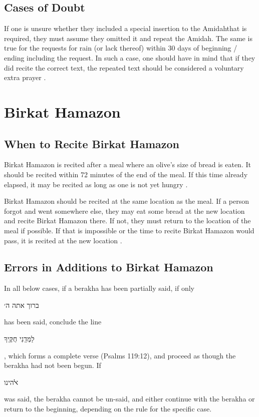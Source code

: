 \documentclass[11pt]{article}
\newcommand{\hebword}[1]{‎\begin{hebrew}\beginR #1 \endR\end{hebrew}}
\newcommand{\amidah}{Amidah\space}
\newcommand{\amidahnospace}{Amidah}
\begin{document}
\subsection{Cases of Doubt}

If one is unsure whether they included a special insertion to the \amidah that is required, they must assume they omitted it and repeat the \amidahnospace.  The same is true for the requests for rain (or lack thereof) within 30 days of beginning / ending including the request.  In such a case, one should have in mind that if they did recite the correct text, the repeated text should be considered a voluntary extra prayer \parencite*[18:6]{PH}.

\section{Birkat Hamazon}

\subsection{When to Recite Birkat Hamazon}

Birkat Hamazon is recited after a meal where an olive's size of bread is eaten. It should be recited within 72 minutes of the end of the meal.  If this time already elapsed, it may be recited as long as one is not yet hungry \parencite*[44:8]{Kitzur}.

Birkat Hamazon should be recited at the same location as the meal. If a person forgot and went somewhere else, they may eat some bread at the new location and recite Birkat Hamazon there. If not, they must return to the location of the meal if possible.  If that is impossible or the time to recite Birkat Hamazon would pass, it is recited at the new location \parencite*[44:9]{Kitzur}.

\subsection{Errors in Additions to Birkat Hamazon}

In all below cases, if a berakha has been partially said, if only \hebword{ברוך אתה ה׳} has been said, conclude the line \hebword{לַמְּדֵֽנִי חֻקֶּֽיךָ}, which forms a complete verse (Psalms 119:12), and proceed as though the berakha had not been begun.  If \hebword{ﭏהינו} was said, the berakha cannot be un-said, and either continue with the berakha or return to the beginning, depending on the rule for the specific case.
\end{document}
